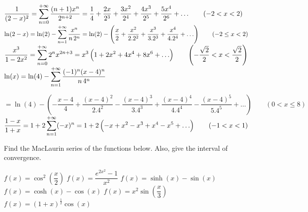 \begin{Answer}

    \Question $\dfrac{1}{(2-x)^2} = \displaystyle\sum_{n=0}^{+\infty} \dfrac{(n+1)x^n}{2^{n+2}}  = \dfrac{1}{4} + \dfrac{2x}{2^3} + \dfrac{3x^2}{2^4}  + \dfrac{4x^3}{2^5} + \dfrac{5x^4}{2^6} + \ldots \qquad (-2 < x < 2)$
    \Question $\ln (2-x) = \ln (2) -  \displaystyle\sum_{n=1}^{+\infty} \dfrac{x^{n}}{n\,2^{n}} = \ln(2) - \left( \dfrac{x}{2} + \dfrac{x^2}{2.2^2} + \dfrac{x^3}{3.2^3} + \dfrac{x^4}{4.2^4} + \ldots \right) \qquad (-2 \leq x < 2)$
    \Question $\dfrac{x^3}{1-2x^2} = \displaystyle\sum_{n=0}^{+\infty} 2^n x^{2n+3} = x^3 \left( 1+2x^2+4x^4+8x^6 + \ldots \right) \qquad \left(-\dfrac{\sqrt{2}}{2} < x < \dfrac{\sqrt{2}}{2} \right)$
    \Question $\ln (x) = \ln (4) - \displaystyle\sum_{n=1}^{+\infty} \dfrac{(-1)^n (x-4)^n}{n\,4^n} $
    
     $= \ln(4) - \left( - \dfrac{x-4}{4} + \dfrac{(x-4)^2}{2.4^2} - \dfrac{(x-4)^3}{3.4^3} + \dfrac{(x-4)^4}{4.4^4} - \dfrac{(x-4)^5}{5.4^5} + \ldots \right) \qquad (0 < x \leq 8)$
    \Question $\dfrac{1-x}{1+x} = 1 + 2 \displaystyle\sum_{n=1}^{+\infty}  (-x)^n = 1 + 2 \left( -x+x^2-x^3+x^4-x^5 + \ldots \right) \qquad (-1 < x < 1)$
    
\end{Answer}

\begin{Exercise} Find the MacLaurin series of the functions below. Also, give the interval of convergence.
\begin{multicols}{2}
    \Question[difficulty = 2] $f(x) = \cos^2\left(\dfrac{x}{2} \right) $
    \Question[difficulty = 2] $f(x)=\dfrac{e^{2x^2}-1}{x^2} $
    \Question[difficulty = 3] $f(x)=\sinh (x) - \sin (x)$
    \Question[difficulty = 3] $f(x)=\cosh (x) - \cos (x)$
    \Question[difficulty = 1] $f(x) = x^2 \sin \left(\dfrac{x}{3} \right) $
    \Question[difficulty = 2] $f(x) = (1+x)^{\frac{1}{2}} \cos (x) $ 
    \EndCurrentQuestion
\end{multicols}
\end{Exercise}

